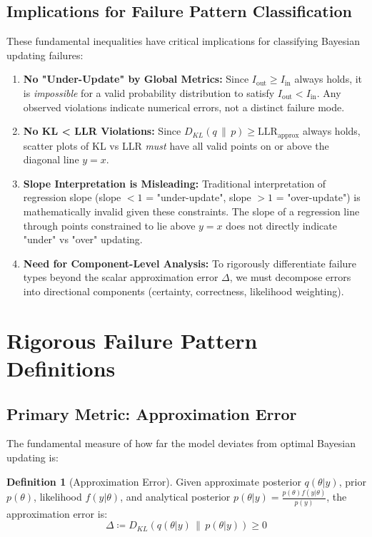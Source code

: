 \documentclass{article}
\theoremstyle{definition}
\newtheorem{definition}{Definition}
\begin{document}
\subsection{Implications for Failure Pattern Classification}

These fundamental inequalities have critical implications for classifying Bayesian updating failures:

\begin{enumerate}
    \item \textbf{No "Under-Update" by Global Metrics:} Since $I_{\text{out}} \geq I_{\text{in}}$ always holds, it is \emph{impossible} for a valid probability distribution to satisfy $I_{\text{out}} < I_{\text{in}}$. Any observed violations indicate numerical errors, not a distinct failure mode.

    \item \textbf{No KL < LLR Violations:} Since $D_{KL}(q \,\|\, p) \geq \text{LLR}_{\text{approx}}$ always holds, scatter plots of KL vs LLR \emph{must} have all valid points on or above the diagonal line $y = x$.

    \item \textbf{Slope Interpretation is Misleading:} Traditional interpretation of regression slope (slope $< 1$ = "under-update", slope $> 1$ = "over-update") is mathematically invalid given these constraints. The slope of a regression line through points constrained to lie above $y = x$ does not directly indicate "under" vs "over" updating.

    \item \textbf{Need for Component-Level Analysis:} To rigorously differentiate failure types beyond the scalar approximation error $\Delta$, we must decompose errors into directional components (certainty, correctness, likelihood weighting).
\end{enumerate}

\newpage
\section{Rigorous Failure Pattern Definitions}

\subsection{Primary Metric: Approximation Error}

The fundamental measure of how far the model deviates from optimal Bayesian updating is:
\begin{definition}[Approximation Error]
Given approximate posterior $q(\theta|y)$, prior $p(\theta)$, likelihood $f(y|\theta)$, and analytical posterior $p(\theta|y) = \frac{p(\theta)f(y|\theta)}{p(y)}$, the approximation error is:
\begin{equation}
\Delta \coloneqq D_{KL}(q(\theta|y) \,\|\, p(\theta|y)) \geq 0
\end{equation}
\end{definition}
\end{document}
